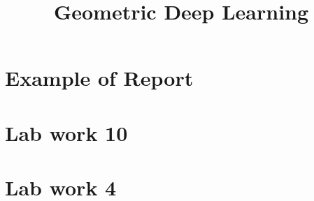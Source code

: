 \documentclass[a4paper,14pt]{article}
\title{Geometric Deep Learning}
\date{}
\numberwithin{equation}{section}
\begin{document}
    \maketitle
    \tableofcontents
    
    \clearpage
    \section{Example of Report} %
    {} %
    
    \clearpage
    \section{Lab work 10} %
    {} %
    
    \clearpage
    \section{Lab work 4} %
    {} %

    \clearpage
    \printbibliography
\end{document}

